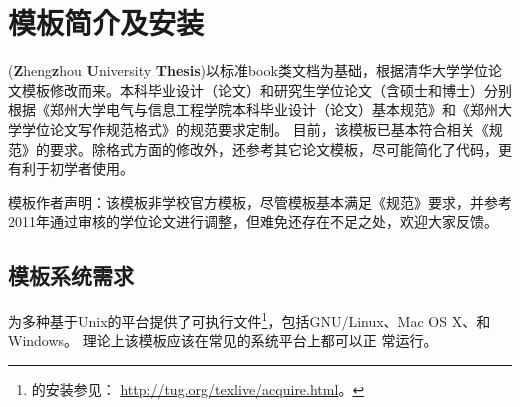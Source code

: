 
\chapter{模板简介及安装}
\label{cha:introduction}

\zzuthesis(\textbf{Z}heng\textbf{z}hou \textbf{U}niversity \textbf{Thesis})以标准book类文档为基础，根据清华大学学位论文模板修改而来。本科毕业设计（论文）和研究生学位论文（含硕士和博士）分别根据《郑州大学电气与信息工程学院本科毕业设计（论文）基本规范》和《郑州大学学位论文写作规范格式》的规范要求定制。
目前，该模板已基本符合相关《规范》的要求。除格式方面的修改外，还参考其它论文模板，尽可能简化了代码，更有利于初学者使用。

\textsf{模板作者声明：}该模板非学校官方模板，尽管模板基本满足《规范》要求，并参考2011年通过审核的学位论文进行调整，但难免还存在不足之处，欢迎大家反馈。

% 
% 
% 
  
\section{模板系统需求}
\label{sec:requirements}

\TeXLive{}为多种基于Unix的平台提供了可执行文件\footnote{\TeXLive{}的安装参见：
\url{http://tug.org/texlive/acquire.html}。}，包括GNU/Linux、Mac OS X、和Windows。
理论上该模板应该在常见的系统平台上都可以正
常运行。

